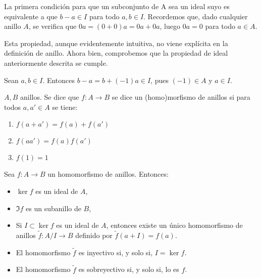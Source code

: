   \begin{obs}
      La primera condición para que un subconjunto de A sea un ideal suyo
      es equivalente a que \(b - a \in I\) para todo \(a, b \in I\). 
      Recordemos que, dado cualquier anillo \(A\), se verifica que \(0a = (0+0)a
      = 0a + 0a\), luego \(0a = 0\) para todo \(a \in A\).
      
      Esta propiedad, aunque evidentemente intuitiva, no viene explícita
      en la definición de anillo. Ahora bien, comprobemos que la propiedad
      de ideal anteriormente descrita se cumple.
      
      Sean \(a, b \in I\). Entonces \(b - a = b + (-1)a \in I\), pues \((-1) \in A\)
      y \(a \in I\). 
   \end{obs}

   \begin{df}\label{df:homo_anillos}
     \(A,B\) anillos. Se dice que \(f:A\longrightarrow B\) se dice un
     (homo)morfismo de anillos si para todos \(a,a'\in A\) se tiene:
     \begin{enumerate}
     \item \(f(a+a')=f(a)+f(a')\)
     \item \(f(aa')=f(a)f(a')\)
     \item \(f(1)=1\)
     \end{enumerate}
   \end{df} 

  
  \begin{teo}
    Sea \(f:A\longrightarrow B\) un homomorfismo de anillos. Entonces:
    \begin{itemize}
      \item \(\ker f\) es un ideal de \(A\),
      \item \(\Im f\) es un subanillo de \(B\),
      \item Si \(I\subset \ker f\) es un ideal de \(A\), entonces
        existe un único homomorfismo de anillos
        \(\tilde{f}:A/I\longrightarrow B\) definido por \(\tilde{f}(a+I)=f(a)\).
      \item El homomorfismo \(\tilde{f}\) es inyectivo si, y solo si,
        \(I=\ker f\).
      \item El homomorfismo \(\tilde{f}\) es sobreyectivo si, y solo si, lo es
        \(f\).
    \end{itemize}
  \end{teo}